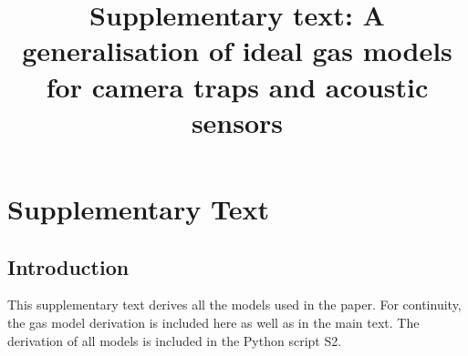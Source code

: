 \documentclass[a4paper,10pt,reqno,oneside]{amsart}
\begin{document}
\title[Supp. Text: Gas models.]{Supplementary text: A generalisation of ideal gas models for camera traps and acoustic sensors}
\maketitle

\tableofcontents
\section{Supplementary Text}
\subsection{Introduction}
This supplementary text derives all the models used in the paper. For continuity, the gas model derivation is included here as well as in the main text. The derivation of all models is included in the Python script S2. 







\clearpage
	
	
\end{document}
